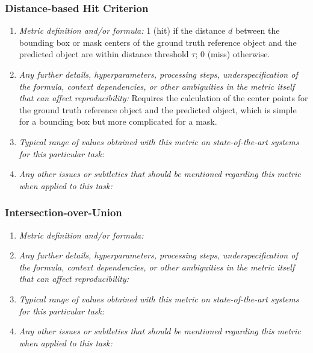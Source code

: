 \documentclass[a4paper,11pt]{article}
\begin{document}
    \subsubsection{Distance-based Hit Criterion}
        \begin{enumerate}[label=\alph*.]
            \item \textit{Metric definition and/or formula:} 1 (hit) if the distance $d$ between the bounding box or mask centers of the ground truth reference object and the predicted object are within distance threshold $\tau$; 0 (miss) otherwise.  
            \bigskip
            \item \textit{Any further details, hyperparameters, processing steps, underspecification of the formula, context dependencies, or other ambiguities in the metric itself that can affect reproducibility:} Requires the calculation of the center points for the ground truth reference object and the predicted object, which is simple for a bounding box but more complicated for a mask.
            \bigskip
            \item \textit{Typical range of values obtained with this metric on state-of-the-art systems for this particular task:}
            \bigskip
            \item \textit{Any other issues or subtleties that should be mentioned regarding this metric when applied to this task:}
            \bigskip
        \end{enumerate}
    
    \subsubsection{Intersection-over-Union}
        \begin{enumerate}[label=\alph*.]
            \item \textit{Metric definition and/or formula:}
            \bigskip
            \item \textit{Any further details, hyperparameters, processing steps, underspecification of the formula, context dependencies, or other ambiguities in the metric itself that can affect reproducibility:}
            \bigskip
            \item \textit{Typical range of values obtained with this metric on state-of-the-art systems for this particular task:}
            \bigskip
            \item \textit{Any other issues or subtleties that should be mentioned regarding this metric when applied to this task:}
            \bigskip
        \end{enumerate}
    
\end{document}
